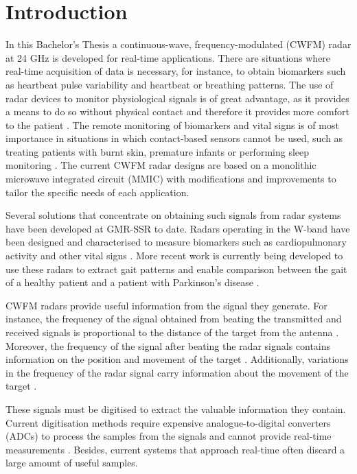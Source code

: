 \chapter{Introduction} \label{cha:intro}

	In this Bachelor's Thesis a continuous-wave, frequency-modulated (CWFM) radar at 24 GHz is developed for real-time applications. There are situations where real-time acquisition of data is necessary, for instance, to obtain biomarkers such as heartbeat pulse variability and heartbeat or breathing patterns. The use of radar devices to monitor physiological signals is of great advantage, as it provides a means to do so without physical contact and therefore it provides more comfort to the patient \cite{Saner2020}. The remote monitoring of biomarkers and vital signs is of most importance in situations in which contact-based sensors cannot be used, such as treating patients with burnt skin, premature infants or performing sleep monitoring \cite{BoricLubecke2016}.  The current CWFM radar designs are based on a monolithic microwave integrated circuit (MMIC) with modifications and improvements to tailor the specific needs of each application.
	
	Several solutions that concentrate on obtaining such signals from radar systems have been developed at GMR-SSR to date. Radars operating in the W-band have been designed and characterised to measure biomarkers such as cardiopulmonary activity \cite{Antolinos2020} and other vital signs \cite{Sardinero2022}. More recent work is currently being developed to use these radars to extract gait patterns \cite{Zhang2012} and enable comparison between the gait of a healthy patient and a patient with Parkinson's disease \cite{Sardinero2022}.
	
	CWFM radars provide useful information from the signal they generate. For instance, the frequency of the signal obtained from beating the transmitted and received signals is proportional to the distance of the target from the antenna \cite[p.~20-27]{Richards2010}. Moreover, the frequency of the signal after beating the radar signals contains information on the position and movement of the target \cite{Wang2014}. Additionally, variations in the frequency of the radar signal carry information about the movement of the target \cite{Kernec2019,Gurbuz2019}.
	
	These signals must be digitised to extract the valuable information they contain. Current digitisation methods require expensive analogue-to-digital converters (ADCs) to process the samples from the signals \cite[p.~7]{Antolinos2020} \cite[p.~26]{Sardinero2022} and cannot provide real-time measurements \cite[p.~38]{Sardinero2022}. Besides, current systems that approach real-time often discard a large amount of useful samples.
	
